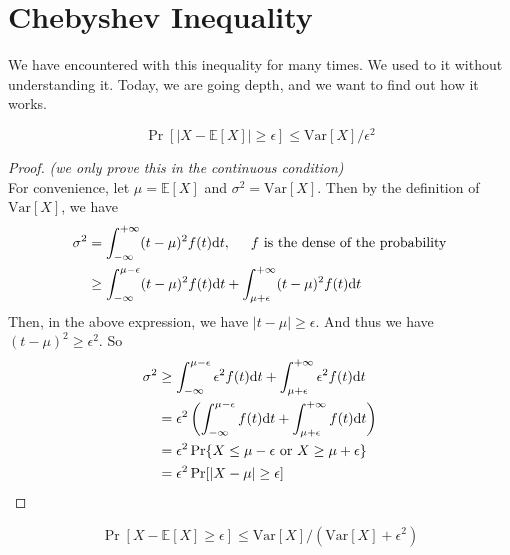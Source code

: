 \section{Chebyshev Inequality}
We have encountered with this inequality for many times.
We used to it without understanding it.
Today, we are going depth, and we want to find out how it works.
\begin{theorem}
  \[\Pr[|X - \mathbb{E}[X]| \geq \epsilon] \leq \mathrm{Var}[X]/\epsilon^2\]
\end{theorem}
\begin{proof}
  \emph{(we only prove this in the continuous condition)}\\
  For convenience, let $\mu = \mathbb{E}[X]$ and $\sigma^2 = \mathrm{Var}[X]$.
  Then by the definition of $\mathrm{Var}[X]$, we have
  \begin{align*}
    \sigma^2 &= \int_{-\infty}^{+\infty} (t - \mu)^2f(t)\mathrm{d}t, \hspace{0.5cm} \mbox{$f$ is the dense of the probability} \\
    &\geq \int_{-\infty}^{\mu-\epsilon} (t - \mu)^2f(t)\mathrm{d}t + \int_{\mu+\epsilon}^{+\infty} (t-\mu)^2f(t)\mathrm{d}t
  \end{align*}
  Then, in the above expression, we have $|t - \mu|\geq \epsilon$.
  And thus we have $(t - \mu)^2 \geq \epsilon^2$.
  So
  \begin{align*}
    \sigma^2 &\geq \int_{-\infty}^{\mu-\epsilon}\epsilon^2f(t)\mathrm{d}t + \int_{\mu+\epsilon}^{+\infty} \epsilon^2f(t)\mathrm{d}t \\
    &= \epsilon^2\left(\int_{-\infty}^{\mu-\epsilon}f(t)\mathrm{d}t + \int_{\mu+\epsilon}^{+\infty} f(t)\mathrm{d}t\right)\\
    &= \epsilon^2\Pr\{\mbox{$X\leq \mu - \epsilon$ or $X \geq \mu + \epsilon$}\} \\
    &= \epsilon^2\Pr[|X - \mu| \geq \epsilon] \qedhere
  \end{align*}
\end{proof}
\begin{theorem}
  \[\Pr[X - \mathbb{E}[X] \geq \epsilon] \leq \mathrm{Var}[X]/(\mathrm{Var}[X] + \epsilon^2)\]
\end{theorem}

